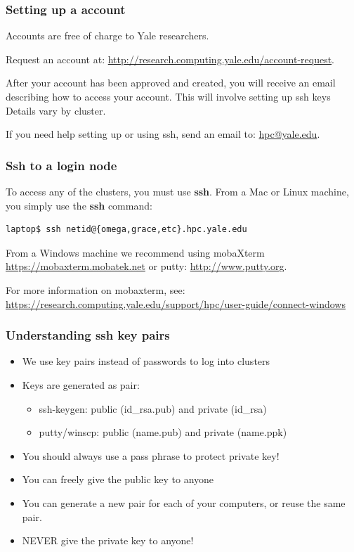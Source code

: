 \documentclass[10pt]{beamer}
\begin{document}
\begin{frame}[fragile]
\frametitle{Setting up a account}

Accounts are free of charge to Yale researchers.
\vskip10pt

Request an account at: \url{http://research.computing.yale.edu/account-request}.

\vskip10pt

After your account has been approved and created, you will receive
an email describing how to access your account.  This will involve setting up ssh keys Details vary by cluster.

\vskip10pt
If you need help setting up or using ssh, send an email to: \url{hpc@yale.edu}.
\end{frame}

\begin{frame}[fragile]
\frametitle{Ssh to a login node}
To access any of the clusters, you must use \textbf{ssh}.
From a Mac or Linux machine, you simply use the \textbf{ssh} command:

\begin{verbatim}
laptop$ ssh netid@{omega,grace,etc}.hpc.yale.edu
\end{verbatim}

From a Windows machine we recommend using mobaXterm
\url{https://mobaxterm.mobatek.net} or putty: \url{http://www.putty.org}.

\vskip10pt
For more information on mobaxterm, see:
\url{https://research.computing.yale.edu/support/hpc/user-guide/connect-windows}
\end{frame}

\begin{frame}[fragile]
\frametitle{Understanding ssh key pairs}
\begin{itemize}
\item We use key pairs instead of passwords to log into clusters
\item Keys are generated as pair:
\begin{itemize}
\item ssh-keygen: public (id\_rsa.pub) and private (id\_rsa)
\item putty/winscp: public (name.pub) and private (name.ppk)
\end{itemize}
\item You should always use a pass phrase to protect private key!
\item You can freely give the public key to anyone
\item You can generate a new pair for each of your computers, or reuse the same pair.
\item NEVER give the private key to anyone!
\end{itemize}
\end{frame}
\end{document}
